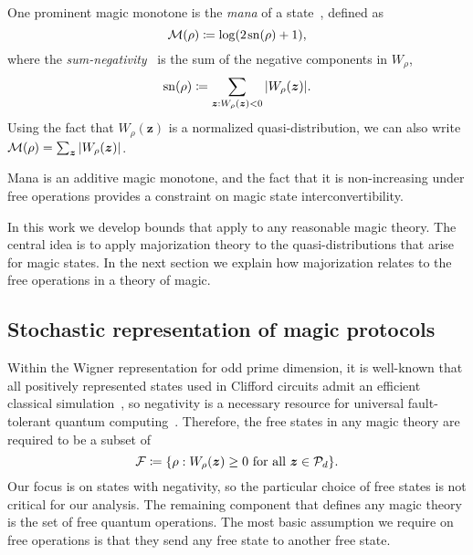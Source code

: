 \documentclass[
onecolumn,
superscriptaddress
]{revtex4-1}
\def\z{\boldsymbol{z}}
\def\M{{\cal M}}
\def\F{{\cal F}}
\renewcommand{\P}{{\cal P}}
\begin{document}
One prominent magic monotone is the \emph{mana} of a state~\cite{cit:veitch2}, defined as
\begin{equation}
    \M(\rho) \coloneqq \log (2\hspace{1pt}{\rm sn}(\rho)+1),
\end{equation}
where the \emph{sum-negativity}~\cite{cit:veitch2} is the sum of the negative components in $W_\rho$,
\begin{equation}
    {\rm sn}(\rho) \coloneqq \sum\limits_{\z: W_\rho(\z) < 0} \abs{W_\rho(\z)}.
\end{equation}
Using the fact that $W_\rho(\z)$ is a normalized quasi-distribution, we can also write $\M(\rho) = \sum_{\z} |W_\rho(\z)|$.

Mana is an additive magic monotone, and the fact that it is non-increasing under free operations provides a constraint on magic state interconvertibility.

In this work we develop bounds that apply to any reasonable magic theory. The central idea is to apply majorization theory to the quasi-distributions that arise for magic states. In the next section we explain how majorization relates to the free operations in a theory of magic.


\subsection*{Stochastic representation of magic protocols}

Within the Wigner representation for odd prime dimension, it is well-known that all positively represented states used in Clifford circuits admit an efficient classical simulation~\cite{cit:mari}, so negativity is a necessary resource for universal fault-tolerant quantum computing~\cite{cit:veitch}. Therefore, the free states in any magic theory are required to be a subset of
\begin{equation}
    \F \coloneqq \{ \rho: W_\rho(\z) \geq 0 \text{ for all } \z \in \P_d\}.
\end{equation}
Our focus is on states with negativity, so the particular choice of free states is not critical for our analysis. The remaining component that defines any magic theory is the set of free quantum operations. The most basic assumption we require on free operations is that they send any free state to another free state.
\end{document}
